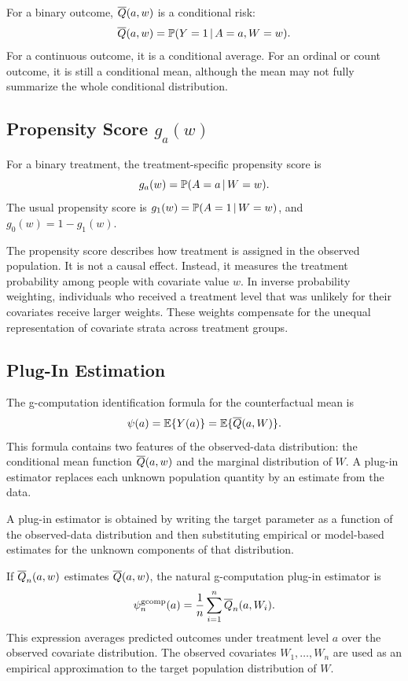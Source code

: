For a binary outcome, $\overline{Q}(a,w)$ is a conditional risk:
\[
\overline{Q}(a,w)=\mathbb{P}(Y=1\,\vert\, A=a,W=w).
\]
For a continuous outcome, it is a conditional average. For an ordinal or count outcome,
it is still a conditional mean, although the mean may not fully summarize the whole
conditional distribution.

\subsection{Propensity Score $g_a(w)$}

\begin{definition}
For a binary treatment, the treatment-specific propensity score is
\[
g_a(w)=\mathbb{P}(A=a\,\vert\, W=w).
\]
The usual propensity score is $g_1(w)=\mathbb{P}(A=1\,\vert\, W=w)$, and
$g_0(w)=1-g_1(w)$.
\end{definition}

The propensity score describes how treatment is assigned in the observed population.
It is not a causal effect. Instead, it measures the treatment probability among people
with covariate value $w$. In inverse probability weighting, individuals who received a
treatment level that was unlikely for their covariates receive larger weights. These
weights compensate for the unequal representation of covariate strata across treatment
groups.

\subsection{Plug-In Estimation}

The g-computation identification formula for the counterfactual mean is
\[
\psi(a)=\mathbb{E}\{Y(a)\}=\mathbb{E}\{\overline{Q}(a,W)\}.
\]
This formula contains two features of the observed-data distribution:
the conditional mean function $\overline{Q}(a,w)$ and the marginal distribution of $W$.
A plug-in estimator replaces each unknown population quantity by an estimate from
the data.

\begin{definition}
A plug-in estimator is obtained by writing the target parameter as a function of the
observed-data distribution and then substituting empirical or model-based estimates
for the unknown components of that distribution.
\end{definition}

If $\overline{Q}_n(a,w)$ estimates $\overline{Q}(a,w)$, the natural g-computation plug-in estimator is
\[
\psi_n^{\mathrm{gcomp}}(a)
=
\frac{1}{n}\sum_{i=1}^n \overline{Q}_n(a,W_i).
\]
This expression averages predicted outcomes under treatment level $a$ over the
observed covariate distribution. The observed covariates $W_1,\ldots,W_n$ are used
as an empirical approximation to the target population distribution of $W$.

